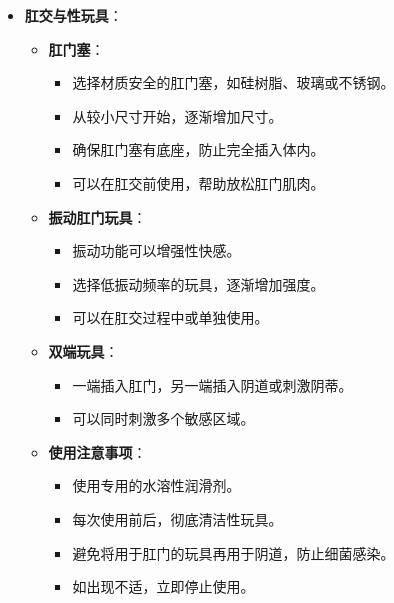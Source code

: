 \documentclass[12pt,UTF8]{ctexbook}
\begin{document}
\begin{itemize}
\begin{itemize}
		\item \textbf{侧卧位}：双方侧卧，男性从背后插入。优点是节省体力，女性可以放松身心。
		\item \textbf{女上男下}：女性坐在男性身上，控制插入的节奏和深度。优点是女性可以自己寻找最舒适的位置。
		\item \textbf{跪趴位}：女性跪趴，男性从背后插入。优点是可以深入刺激，但女性的控制度较低。
		\item \textbf{坐位}：男性坐在椅子或床上，女性坐在男性腿上。优点是双方可以亲密接触，适合情感交流。
		\item \textbf{半躺位}：女性半躺在床头或沙发上，双腿弯曲，男性站在床边插入。优点是女性可以放松，同时保持一定的控制度。
	\end{itemize}
	\item \textbf{肛交与性玩具}：
	\begin{itemize}
		\item \textbf{肛门塞}：
		\begin{itemize}
			\item 选择材质安全的肛门塞，如硅树脂、玻璃或不锈钢。
			\item 从较小尺寸开始，逐渐增加尺寸。
			\item 确保肛门塞有底座，防止完全插入体内。
			\item 可以在肛交前使用，帮助放松肛门肌肉。
		\end{itemize}
		\item \textbf{振动肛门玩具}：
		\begin{itemize}
			\item 振动功能可以增强性快感。
			\item 选择低振动频率的玩具，逐渐增加强度。
			\item 可以在肛交过程中或单独使用。
		\end{itemize}
		\item \textbf{双端玩具}：
		\begin{itemize}
			\item 一端插入肛门，另一端插入阴道或刺激阴蒂。
			\item 可以同时刺激多个敏感区域。
		\end{itemize}
		\item \textbf{使用注意事项}：
		\begin{itemize}
			\item 使用专用的水溶性润滑剂。
			\item 每次使用前后，彻底清洁性玩具。
			\item 避免将用于肛门的玩具再用于阴道，防止细菌感染。
			\item 如出现不适，立即停止使用。
		\end{itemize}
	\end{itemize}
\end{itemize}
\end{document}
